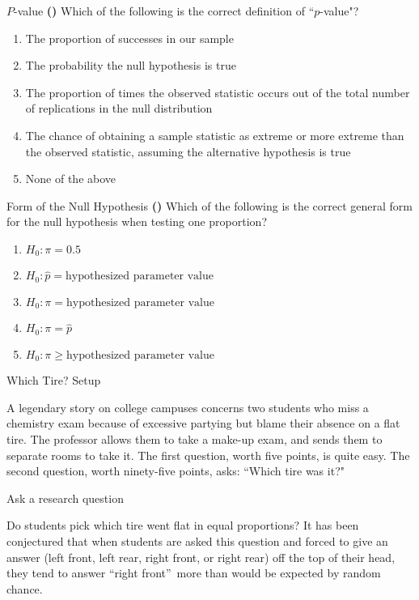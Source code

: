 \documentclass[13pt]{beamer}
\newcounter{count}
\newcommand{\question}{ \textbf{(\decimal{count})} \stepcounter{count}}
\begin{document}
\begin{frame}{$P$-value}
\question Which of the following is the correct definition of ``$p$-value"?
\begin{enumerate}[A]
	\item The proportion of successes in our sample
    \item The probability the null hypothesis is true
    \item The proportion of times the observed statistic occurs out of the total number of replications in the null distribution
    \item The chance of obtaining a sample statistic as extreme or more extreme than the observed statistic, assuming the alternative hypothesis is true
    \item None of the above
\end{enumerate}
\end{frame}

\begin{frame}{Form of the Null Hypothesis}
\question Which of the following is the correct general form for the null hypothesis when testing one proportion?
\begin{enumerate}[A]
	\item $H_0: \pi = 0.5$
    \item $H_0: \hat{p} = \text{hypothesized parameter value}$
    \item $H_0: \pi =  \text{hypothesized parameter value}$
    \item $H_0: \pi = \hat{p}$
    \item $H_0: \pi \geq \text{hypothesized parameter value}$
\end{enumerate}

\end{frame}

\begin{frame}{Which Tire? Setup}

A legendary story on college campuses concerns two students who miss
a chemistry exam because of excessive partying but blame their absence on a
flat tire. The professor allows them to take a make-up exam, and sends them to
separate rooms to take it. The first question, worth five points, is quite
easy. The second question, worth ninety-five points, asks: ``Which tire was
it?"
\end{frame}

\begin{frame}{Ask a research question}

Do students pick which tire went flat in equal proportions? It has
been conjectured that when students are asked this question and forced to give
an answer (left front, left rear, right front, or right rear) off the top of
their head, they tend to answer \textquotedblleft right
front\textquotedblright\ more than would be expected by random chance.
\end{frame}
\end{document}
